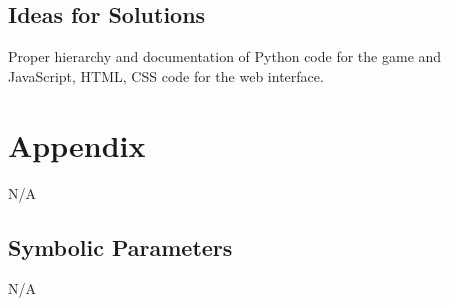 \documentclass[12pt, titlepage]{article}
\begin{document}
\subsection{Ideas for Solutions}
Proper hierarchy and documentation of Python code for the game and JavaScript, HTML, CSS code for the web interface.

\section{Appendix}
N/A

\subsection{Symbolic Parameters}
N/A

\newpage



\end{document}
